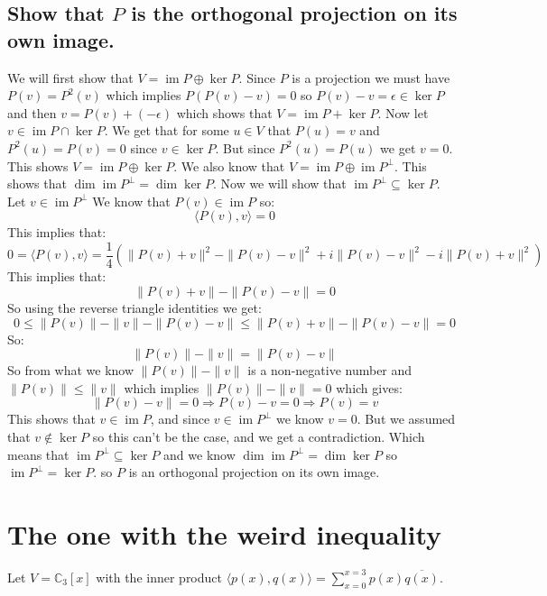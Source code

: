 \documentclass[11pt,a4paper]{article}
\theoremstyle{plain}
\DeclareMathOperator{\im}{im}
\newcommand{\C}{\mathbb{C}}
\begin{document}
	\subsection{Show that $P$ is the orthogonal projection on its own image.}
	We will first show that $V = \im P \oplus \ker P$. Since $P$ is a projection
	we must have $P(v) = P^2(v)$ which implies $P(P(v)-v) = 0$ so 
	$P(v) - v = \epsilon \in \ker P$ and then $v = P(v) + (-\epsilon)$ which
	shows that $V = \im P + \ker P$. Now let $v\in \im P \cap \ker P$. We
	get that for some $u\in V$ that $P(u) = v$ and $P^2(u) = P(v) = 0$ since
	$v\in \ker P$. But since $P^2(u) = P(u)$ we get $v = 0$. This shows
	$V = \im P \oplus \ker P$. We also know that $V = \im P \oplus \im P^\bot$.
	This shows that $\dim\im P^\bot = \dim\ker P$. Now we will show that
	$\im P^\perp \subseteq \ker P$. Let $v\in\im P^\perp$ We know that 
	$P(v)\in\im P$ so:
	\[
		\langle P(v), v\rangle = 0
	\]
	This implies that:
	\[
		0 = \langle P(v), v\rangle = \frac{1}{4}
		\left(
			\|P(v)+v\|^2 - \|P(v)-v\|^2 + i\|P(v)-v\|^2 - i\|P(v)+v\|^2
		\right)
	\]
	This implies that:
	\[
		\|P(v)+v\| - \|P(v)-v\| = 0
	\]
	So using the reverse triangle identities we get:
	\[
		0 \le \|P(v)\| - \|v\| - \|P(v)-v\| \le \|P(v)+v\| - \|P(v)-v\| = 0
	\]
	So:
	\[
		\|P(v)\| - \|v\| = \|P(v)-v\|
	\]
	So from what we know $\|P(v)\| - \|v\|$ is a non-negative number and
	$\|P(v)\| \le \|v\|$ which implies  $\|P(v)\| - \|v\| = 0$ which gives:
	\[
		\|P(v)-v\| = 0 \Rightarrow P(v) - v = 0 \Rightarrow P(v) = v
	\]
	This shows that $v\in\im P$, and since $v\in\im P^\bot$ we know $v=0$.
	But we assumed that $v\notin\ker P$ so this can't be the case, and we get a
	contradiction. Which means that $\im P^\perp \subseteq \ker P$ and we know
	$\dim\im P^\bot = \dim\ker P$ so $\im P^\bot = \ker P$. so $P$ is an 
	orthogonal projection on its own image.
	
	\newpage

	\section{The one with the weird inequality}
	Let $V=\C_3[x]$ with the inner product 
	$\langle p(x),q(x)\rangle = \sum_{x=0}^{x=3}{p(x)\overline{q(x)}}$.
	
\end{document}
